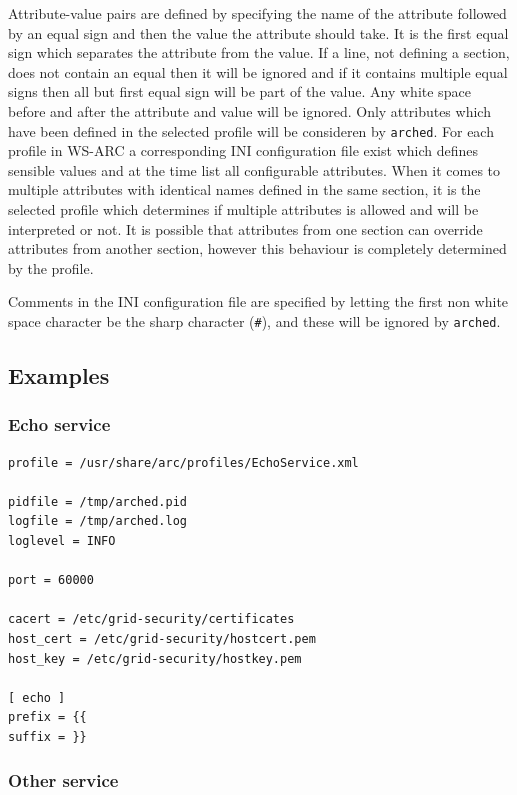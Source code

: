 \documentclass{article}
\begin{document}
Attribute-value pairs are defined by specifying the name of the attribute
followed by an equal sign and then the value the attribute should take. It is
the first equal sign which separates the attribute from the value. If a line,
not defining a section, does not contain an equal then it will be ignored and if
it contains multiple equal signs then all but first equal sign will be part of
the value. Any white space before and after the attribute and value will be
ignored. Only attributes which have been defined in the selected profile will be
consideren by \texttt{arched}. For each profile in WS-ARC a corresponding INI
configuration file exist which defines sensible values and at the time list all
configurable attributes. When it comes to multiple attributes with identical
names defined in the same section, it is the selected profile which determines
if multiple attributes is allowed and will be interpreted or not. It is possible
that attributes from one section can override attributes from another section,
however this behaviour is completely determined by the profile.

Comments in the INI configuration file are specified by letting the first non
white space character be the sharp character (\texttt{\#}), and these will be
ignored by \texttt{arched}.

\subsection{Examples}
\subsubsection{Echo service}

\begin{lstlisting}
profile = /usr/share/arc/profiles/EchoService.xml

pidfile = /tmp/arched.pid
logfile = /tmp/arched.log
loglevel = INFO

port = 60000

cacert = /etc/grid-security/certificates
host_cert = /etc/grid-security/hostcert.pem
host_key = /etc/grid-security/hostkey.pem

[ echo ]
prefix = {{
suffix = }}
\end{lstlisting}

\subsubsection{Other service}
\end{document}
